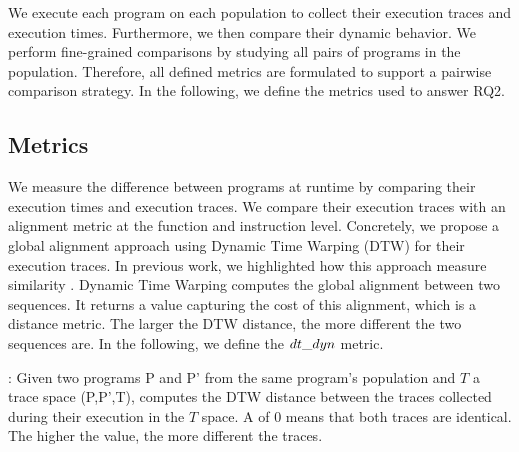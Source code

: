 We execute each program on each population to collect their execution traces and execution times. Furthermore, we then compare their dynamic behavior. We perform fine-grained comparisons by studying all pairs of programs in the population. Therefore, all defined metrics are formulated to support a pairwise comparison strategy.
In the following, we define the metrics used to answer RQ2.

\subsection{Metrics}

We measure the difference between programs at runtime by comparing their execution times and execution traces. We compare their execution traces with an alignment metric at the function and instruction level. Concretely, we propose a global alignment approach using Dynamic Time Warping (DTW) for their execution traces. In previous work, we highlighted how this approach measure similarity \citationneeded. 
Dynamic Time Warping \cite{Maia08usinga} computes the global alignment between two sequences. It returns a value capturing the cost of this alignment, which is a distance metric. The larger the DTW distance, the more different the two sequences are.
In the following, we define the $dt\_dyn$ metric. 
 

\begin{metric}{\DTW{}:}
\label{metric:stack}
	Given two programs P and P' from the same program's population and $T$ a trace space \DTW{}(P,P',T), computes the DTW distance between the traces collected during their execution in the $T$ space. A \DTW{} of $0$ means that both traces are identical. \\ 
	
	The higher the value, the more different the traces. 
\end{metric}

